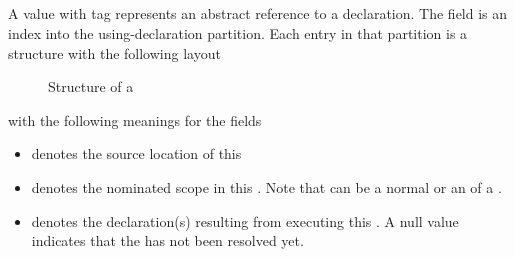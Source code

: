

\subsection{}
\label{sec:ifc:DirSort:DeclUse}

A  value with tag  represents an abstract reference to a  declaration.
The  field is an index into the using-declaration partition.
Each entry in that partition is a structure with the following layout
%
\begin{figure}[H]
    \centering
    \caption{Structure of a }
    \label{fig:ifc:DirSort:DeclUse}
\end{figure}
%
with the following meanings for the fields
\begin{itemize}
    \item {} denotes the source location of this 
    \item {} denotes the nominated scope in this .  Note that  can be a normal  or an  of a .
    \item {} denotes the declaration(s) resulting from executing this .  A null value indicates that the  has not been resolved yet.
\end{itemize}



\subsection{}
\label{sec:ifc:DirSort:Expr}

